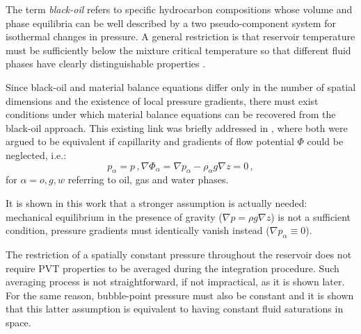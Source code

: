 \documentclass[authoryear,preprint,review,12pt]{elsarticle}
\begin{document}


The term \textit{black-oil} refers to specific hydrocarbon compositions whose volume and phase equilibria can be well described by a two pseudo-component system for isothermal changes in pressure. A general restriction is that reservoir temperature must be sufficiently below the mixture critical temperature so that different fluid phases have clearly distinguishable properties \citep{danesh1998pvt,firoozabadi1999thermodynamics}.

Since black-oil and material balance equations differ only in the number of spatial dimensions and the existence of local pressure gradients, there must exist conditions under which material balance equations can be recovered from the black-oil approach. This existing link was briefly addressed in \cite{ertekin2001basic}, where both were argued to be equivalent if capillarity and gradients of flow potential $\Phi$ could be neglected, i.e.:
\begin{subequations}
\begin{equation}
p_\alpha = p \, ,
\end{equation}
\begin{equation}
\nabla \Phi_\alpha = \nabla p_\alpha - \rho_\alpha g \nabla z = 0 \, ,
\end{equation}
\end{subequations}
for $\alpha=o,g,w$ referring to oil, gas and water phases.

It is shown in this work that a stronger assumption is actually needed: mechanical equilibrium in the presence of gravity ($\nabla p = \rho g \nabla z$) is not a sufficient condition, pressure gradients must identically vanish instead ($\nabla p_\alpha \equiv 0$).

The restriction of a spatially constant pressure throughout the reservoir does not require PVT properties to be averaged during the integration procedure. Such averaging process is not straightforward, if not impractical, as it is shown later. For the same reason, bubble-point pressure must also be constant and it is shown that this latter assumption is equivalent to having constant fluid saturations in space.
\end{document}
